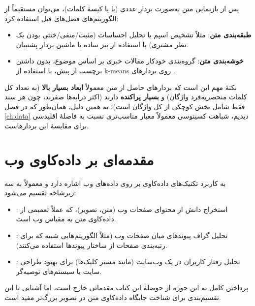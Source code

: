 پس از بازنمایی متن به‌صورت بردار عددی (با  یا کیسهٔ کلمات)،
می‌توان مستقیماً از الگوریتم‌های فصل‌های قبل استفاده کرد:

\begin{itemize}
    \item \textbf{طبقه‌بندی متن}: مثلاً تشخیص اسپم یا تحلیل احساسات
          (مثبت/منفی/خنثی بودن یک نظر مشتری) با استفاده از بیز ساده یا
          ماشین بردار پشتیبان.
    \item \textbf{خوشه‌بندی متن}: گروه‌بندی خودکار مقالات خبری بر اساس
          موضوع، بدون داشتن برچسب از پیش، با استفاده از k-means روی
          بردارهای .
\end{itemize}

نکتهٔ مهم این است که بردارهای حاصل از متن معمولاً \textbf{ابعاد بسیار
بالا} (به تعداد کل کلمات منحصربه‌فرد واژگان) و \textbf{بسیار پراکنده}
دارند (اکثر درایه‌ها صفرند، چون هر سند فقط شامل بخش کوچکی از کل واژگان
است)؛ به همین دلیل، همان‌طور که در فصل \ref{ch:data} دیدیم، شباهت
کسینوسی معمولاً معیار مناسب‌تری نسبت به فاصلهٔ اقلیدسی برای مقایسهٔ این
بردارهاست.

\section{مقدمه‌ای بر داده‌کاوی وب}

 به کاربرد تکنیک‌های
داده‌کاوی بر روی داده‌های وب اشاره دارد و معمولاً به سه زیرشاخه تقسیم
می‌شود:

\begin{itemize}
    \item {}: استخراج
          دانش از محتوای صفحات وب (متن، تصویر)، که عملاً تعمیمی از
          داده‌کاوی متن به مقیاس وب است.
    \item {}: تحلیل
          گراف پیوندهای میان صفحات وب (مثلاً الگوریتم‌هایی شبیه
           که برای رتبه‌بندی صفحات از ساختار پیوندها
          استفاده می‌کنند).
    \item {}: تحلیل
          رفتار کاربران در یک وب‌سایت (مانند مسیر کلیک‌ها) برای بهبود
          طراحی سایت یا سیستم‌های توصیه‌گر.
\end{itemize}

پرداختن کامل به این حوزه از حوصلهٔ این کتاب مقدماتی خارج است، اما آشنایی
با این تقسیم‌بندی برای شناخت جایگاه داده‌کاوی متن در تصویر بزرگ‌تر
مفید است.

